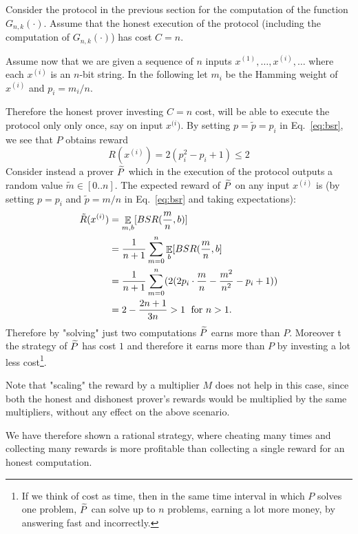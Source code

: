 Consider the protocol in the previous section for the computation of the function 
$G_{n,k}(\cdot)$. Assume that the honest execution of the protocol (including the computation of $G_{n,k}(\cdot)$) has cost $C=n$. 

Assume now that we are given a sequence of $n$ inputs 
$x^{(1)},\ldots,x^{(i)},\ldots$ where each $x^{(i)}$ is an $n$-bit string. 
In the following let $m_i$ be the Hamming weight of $x^{(i)}$ and $p_i=m_i/n$.

Therefore the honest prover investing $C=n$ cost, will be able to execute the protocol only only once, say on input $x^{(i})$.  By setting $p=\tilde{p}=p_i$ in Eq.~\ref{eq:bsr}, we see that $P$ obtains reward 
\[ R(x^{(i)}) = 2(p_i^2-p_i+1) \leq 2 \]
Consider instead a prover $\widetilde{P}$ which in the execution of the protocol outputs a random value $\tilde{m} \in [0..n]$. The expected reward of $\widetilde{P}$ on {\sf any} input $x^{(i)}$ is (by setting $p=p_i$ and $\tilde{p}=m/n$ in Eq.~\ref{eq:bsr} and taking 
expectations):
\begin{align*}
\tilde{R}(x^{(i)}) &= \mathop{\mathbb{E}}_{m,b}[BSR(\frac{m}{n}, b)] \\
                &= \frac{1}{n+1}\sum_{m=0}^{n}\mathop{\mathbb{E}}_b[BSR(\frac{m}{n},b] \\
                &= 
                \frac{1}{n+1}\sum_{m=0}^{n}(2(2p_i \cdot \frac{m}{n}-\frac{m^2}{n^2}-p_i+1))
                 \\
                 &=2-\frac{2n+1}{3n} > 1 \; \mbox{ for $n>1$.}
\end{align*}
Therefore by "solving" just two computations $\widetilde{P}$ earns more than $P$. Moreover t
the strategy of $\widetilde{P}$ has cost $1$ and 
therefore it earns more than $P$ by investing a lot less cost\footnote{
If we think of cost as time, then in the same time interval in which $P$ solves one problem, $\widetilde{P}$ can solve up to $n$ problems, earning a lot 
more money, by answering fast and incorrectly.}.

Note that "scaling" the reward by a multiplier $M$ does not help in this case, since both the honest and dishonest prover's rewards would be multiplied by 
the same multipliers, without any effect on the above scenario. 

We have therefore shown a rational strategy, where cheating many times and collecting many rewards is more profitable than collecting a single reward for an honest computation. 
